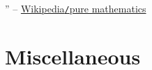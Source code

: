\documentclass{article}
\begin{document}
'' -- \href{https://en.wikipedia.org/wiki/Pure_mathematics}{Wikipedia{\tt/}pure mathematics}


\section{Miscellaneous}


\printbibliography[heading=bibintoc]
	
\end{document}
